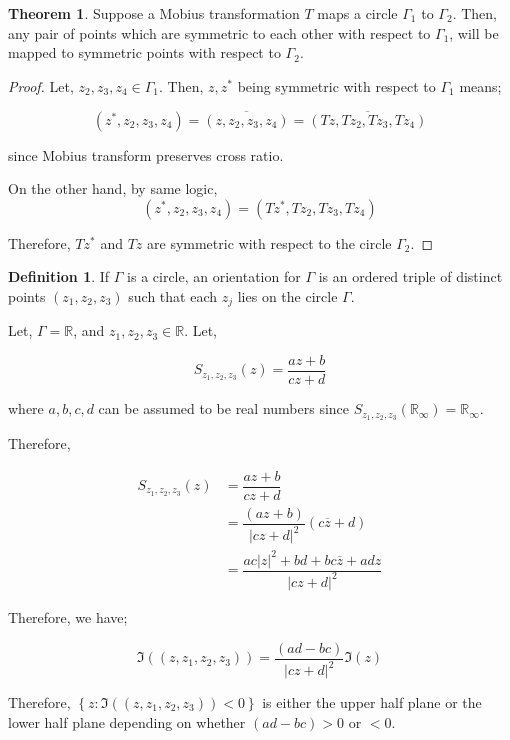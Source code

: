 \documentclass[12pt]{article}
\newcommand{\R}{\mathbb{R}}
\newcommand{\Rinf}{\mathbb{R}_{\infty}}
\theoremstyle{definition}
\newtheorem{thm}{Theorem}
\newtheorem{defn}{Definition}
\newenvironment{definition}{
\begin{tcolorbox}[colback=green!5!white,colframe=green!75!black, parbox = false]\begin{defn} }{\end{defn}\end{tcolorbox} }
\newenvironment{theorem}{
\begin{tcolorbox}[colback=green!5!white,colframe=green!75!black, parbox = false]\begin{thm} }{\end{thm}\end{tcolorbox} }
\begin{document}
\begin{theorem}
    Suppose a Mobius transformation $T$ maps a circle $\Gamma_1$ to $\Gamma_2$. Then, any pair of points which are symmetric to each other with respect to $\Gamma_1$, will be mapped to symmetric points with respect to $\Gamma_2$.
\end{theorem}

\begin{proof}
    Let, $z_2, z_3, z_4 \in \Gamma_1$. Then, $z, z^\ast$ being symmetric with respect to $\Gamma_1$ means;

    $$(z^\ast, z_2, z_3, z_4) = \overline{(z, z_2, z_3, z_4)} = \overline{(Tz, Tz_2, Tz_3, Tz_4)}$$

    since Mobius transform preserves cross ratio. 

    On the other hand, by same logic,
    $$(z^\ast, z_2, z_3, z_4) = (Tz^\ast, Tz_2, Tz_3, Tz_4)$$

    Therefore, $Tz^\ast$ and $Tz$ are symmetric with respect to the circle $\Gamma_2$.
\end{proof}


\begin{definition}
    If $\Gamma$ is a circle, an orientation for $\Gamma$ is an ordered triple of distinct points $(z_1, z_2, z_3)$ such that each $z_j$ lies on the circle $\Gamma$.
\end{definition}

Let, $\Gamma = \R$, and $z_1, z_2, z_3 \in \R$. Let,

$$S_{z_1, z_2, z_3}(z) = \dfrac{az + b}{cz + d}$$

where $a, b, c, d$ can be assumed to be real numbers since $S_{z_1, z_2, z_3}(\Rinf) = \Rinf$. 

Therefore,

\begin{align*}
    S_{z_1, z_2, z_3}(z)
    & = \dfrac{az + b}{cz + d}\\
    & = \dfrac{(az + b)}{\vert cz + d\vert^2} (c\overline{z} + d)\\
    & = \dfrac{ac\vert z\vert^2 + bd + bc\overline{z} + adz}{\vert cz + d\vert^2}
\end{align*}

Therefore, we have;

$$\Im((z, z_1, z_2, z_3)) = \dfrac{(ad-bc)}{\vert cz + d\vert^2}\Im(z)$$

Therefore, $\left\{ z : \Im((z, z_1, z_2, z_3)) < 0 \right\}$ is either the upper half plane or the lower half plane depending on whether $(ad -bc)>0$ or $<0$. 
\end{document}
